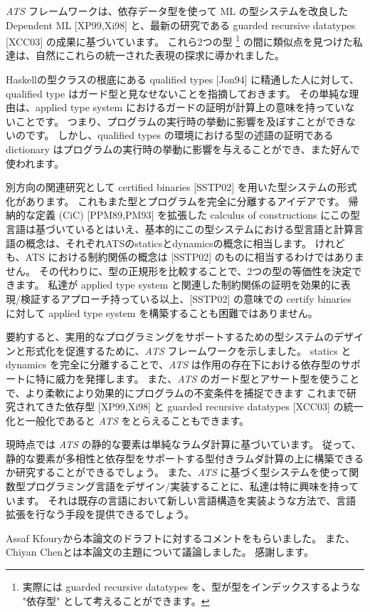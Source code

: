 \documentclass[submit,techreq,noauthor,onecolumn]{ipsj}
\begin{document}
{\it ATS} フレームワークは、依存データ型を使って ML の型システムを改良した Dependent ML [XP99,Xi98] と、最新の研究である guarded recursive datatypes [XCC03] の成果に基づいています。
これら2つの型
\footnote{実際には guarded recursive datatypes を、型が型をインデックスするような "依存型" として考えることができます。}
の間に類似点を見つけた私達は、自然にこれらの統一された表現の探求に導かれました。

Haskellの型クラスの根底にある qualified types [Jon94] に精通した人に対して、qualified type はガード型と見なせないことを指摘しておきます。
その単純な理由は、applied type system におけるガードの証明が計算上の意味を持っていないことです。
つまり、プログラムの実行時の挙動に影響を及ぼすことができないのです。
しかし、qualified types の環境における型の述語の証明である dictionary はプログラムの実行時の挙動に影響を与えることができ、また好んで使われます。

別方向の関連研究として certified binaries [SSTP02] を用いた型システムの形式化があります。
これもまた型とプログラムを完全に分離するアイデアです。
帰納的な定義 (CiC) [PPM89,PM93] を拡張した calculus of constructions にこの型言語は基づいているとはいえ、基本的にこの型システムにおける型言語と計算言語の概念は、それぞれATSのstaticsとdynamicsの概念に相当します。
けれども、ATS における制約関係の概念は [SSTP02] のものに相当するわけではありません。
その代わりに、型の正規形を比較することで、2つの型の等価性を決定できます。
私達が applied type system と関連した制約関係の証明を効果的に表現/検証するアプローチ持っている以上、[SSTP02] の意味での certify binaries に対して applied type system を構築することも困難ではありません。

要約すると、実用的なプログラミングをサポートするための型システムのデザインと形式化を促進するために、{\it ATS} フレームワークを示しました。
statics と dynamics を完全に分離することで、{\it ATS} は作用の存在下における依存型のサポートに特に威力を発揮します。
また、{\it ATS} のガード型とアサート型を使うことで、より柔軟により効果的にプログラムの不変条件を捕捉できます
これまで研究されてきた依存型 [XP99,Xi98] と guarded recursive datatypes [XCC03] の統一化と一般化であると {\it ATS} をとらえることもできます。

現時点では {\it ATS} の静的な要素は単純なラムダ計算に基づいています。
従って、静的な要素が多相性と依存型をサポートする型付きラムダ計算の上に構築できるか研究することができるでしょう。
また、{\it ATS} に基づく型システムを使って関数型プログラミング言語をデザイン/実装することに、私達は特に興味を持っています。
それは既存の言語において新しい言語構造を実装ような方法で、言語拡張を行なう手段を提供できるでしょう。

\begin{acknowledgment}
Assaf Kfouryから本論文のドラフトに対するコメントをもらいました。
また、Chiyan Chenとは本論文の主題について議論しました。
感謝します。
\end{acknowledgment}

\end{document}
